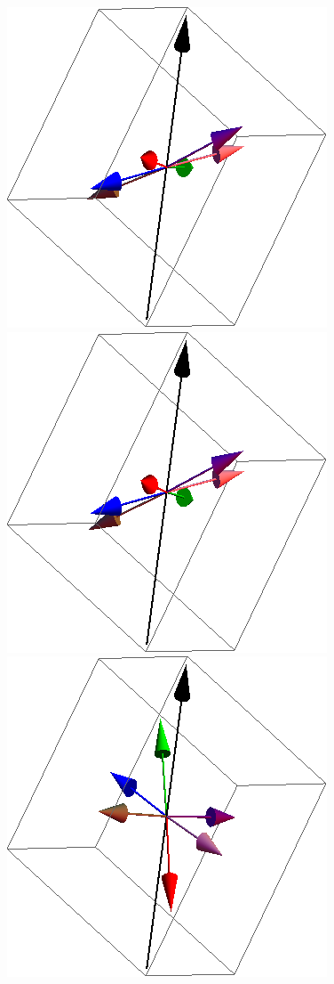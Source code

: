 \documentclass{article}
\begin{document}
\begin{figure}[ht]
\centering
\includegraphics[scale=0.27]{1S005to000R.png}
\includegraphics[scale=0.27]{2S005to000R.png}
\includegraphics[scale=0.27]{3S005to000R.png}

\end{figure}
\end{document}
